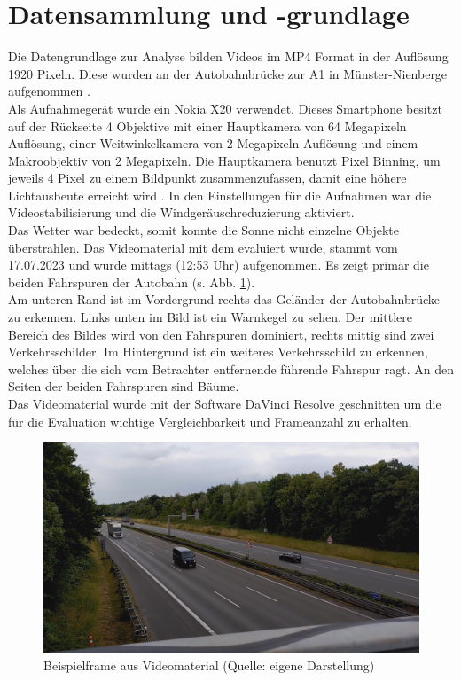 \section{Datensammlung und -grundlage}
{ \label{sec:datengrundlage}
	Die Datengrundlage zur Analyse bilden Videos im MP4 Format in der Auflösung 1920  Pixeln. Diese wurden an der Autobahnbrücke zur A1 in Münster-Nienberge aufgenommen \citep{GMaps}. \\
	Als Aufnahmegerät wurde ein Nokia X20 verwendet. Dieses Smartphone besitzt auf der Rückseite 4 Objektive mit einer Hauptkamera von 64 Megapixeln Auflösung, einer Weitwinkelkamera von 2 Megapixeln Auflösung und einem Makroobjektiv von 2 Megapixeln. Die Hauptkamera benutzt Pixel Binning, um jeweils 4 Pixel zu einem Bildpunkt zusammenzufassen, damit eine höhere Lichtausbeute erreicht wird \citep{Schmitt2021}. In den Einstellungen für die Aufnahmen war die Videostabilisierung und die Windgeräuschreduzierung aktiviert. \\
	Das Wetter war bedeckt, somit konnte die Sonne nicht einzelne Objekte überstrahlen. Das Videomaterial mit dem evaluiert wurde, stammt vom 17.07.2023 und wurde mittags (12:53 Uhr) aufgenommen. Es zeigt primär die beiden Fahrspuren der Autobahn (s. Abb. \ref{Bsp_Evaluations_Vidmat}). \\
	Am unteren Rand ist im Vordergrund rechts das Geländer der Autobahnbrücke zu erkennen. Links unten im Bild ist ein Warnkegel zu sehen. Der mittlere Bereich des Bildes wird von den Fahrspuren dominiert, rechts mittig sind zwei Verkehrsschilder. Im Hintergrund ist ein weiteres Verkehrsschild zu erkennen, welches über die sich vom Betrachter entfernende führende Fahrspur ragt. An den Seiten der beiden Fahrspuren sind Bäume. \\
	Das Videomaterial wurde mit der Software DaVinci Resolve \citep{davinciresolve} geschnitten um die für die Evaluation wichtige Vergleichbarkeit und Frameanzahl zu erhalten.
	\begin{figure}[ht]
		\centering
		\includegraphics*[scale = 0.25, keepaspectratio ]{images/Evaluation/Screenshot_Video_A10s.png}
		\caption[Beispielframe aus Videomaterial]{Beispielframe aus Videomaterial (Quelle: eigene Darstellung)} 
		\label{Bsp_Evaluations_Vidmat}
 \end{figure}
}



